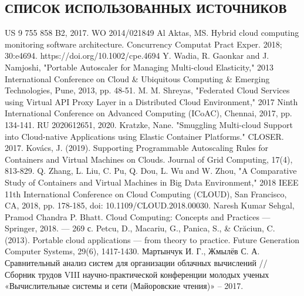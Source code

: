 \begin{center}
\section*{СПИСОК ИСПОЛЬЗОВАННЫХ ИСТОЧНИКОВ}
\end{center}
\begingroup
\renewcommand{\section}[2]{}%
\begin{thebibliography}{40}
US 9 755 858 B2, 2017.
WO 2014/021849 Al
Aktas, MS. Hybrid cloud computing monitoring software architecture. Concurrency Computat Pract Exper. 2018; 30:e4694. https://doi.org/10.1002/cpe.4694
Y. Wadia, R. Gaonkar and J. Namjoshi, "Portable Autoscaler for Managing Multi-cloud Elasticity," 2013 International Conference on Cloud \& Ubiquitous Computing \& Emerging Technologies, Pune, 2013, pp. 48-51.
M. M. Shreyas, "Federated Cloud Services using Virtual API Proxy Layer in a Distributed Cloud Environment," 2017 Ninth International Conference on Advanced Computing (ICoAC), Chennai, 2017, pp. 134-141.
RU 2020612651, 2020.
Kratzke, Nane. "Smuggling Multi-cloud Support into Cloud-native Applications using Elastic Container Platforms." CLOSER. 2017.
Kovács, J. (2019). Supporting Programmable Autoscaling Rules for Containers and Virtual Machines on Clouds. Journal of Grid Computing, 17(4), 813-829.
Q. Zhang, L. Liu, C. Pu, Q. Dou, L. Wu and W. Zhou, "A Comparative Study of Containers and Virtual Machines in Big Data Environment," 2018 IEEE 11th International Conference on Cloud Computing (CLOUD), San Francisco, CA, 2018, pp. 178-185, doi: 10.1109/CLOUD.2018.00030.
Naresh Kumar Sehgal, Pramod Chandra P. Bhatt. Cloud Computing: Concepts and Practices --- Springer, 2018. --- 269 с.
Petcu, D., Macariu, G., Panica, S., \& Crăciun, C. (2013). Portable cloud applications --- from theory to practice. Future Generation Computer Systems, 29(6), 1417-1430.
Мартынчук И. Г., Жмылёв С. А. Сравнительный анализ систем для организации облачных вычислений // Сборник трудов VIII научно-практической конференции молодых ученых «Вычислительные системы и сети (Майоровские чтения)» – 2017.

\end{thebibliography}
